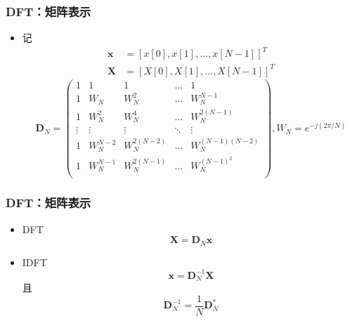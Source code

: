 \documentclass[CJKutf8,dvipsnames,table]{beamer}
\begin{document}
\begin{CJK*}{UTF8}{song}
  \begin{frame}
    \frametitle{DFT：矩阵表示}
    \begin{itemize}
	\item 记
	\begin{align*}
		\mathbf{x} & =[x[0], x[1], \hdots, x[N-1]]^T \\
		\mathbf{X} & =[X[0], X[1], \hdots, X[N-1]]^T
	\end{align*}
	\[
	\mathbf{D}_N=
    \begin{pmatrix}
1      & 1   & 1     & \hdots & 1 \\
1      & W_N & W_N^2 & \hdots & W_N^{N-1} \\
1      & W_N^2 & W_N^4 & \hdots & W_N^{2(N-1)} \\
\vdots & \vdots & \vdots  & \ddots & \vdots \\
1      & W_N^{N-2} & W_N^{2(N-2)} & \hdots & W_N^{(N-1)(N-2)} \\
1      & W_N^{N-1} & W_N^{2(N-1)} & \hdots & W_N^{(N-1)^2} \\

	\end{pmatrix}
	, W_N  = e^{-j(2\pi/N)}
	\]	
	\end{itemize}
  \end{frame} 	
  	
  \begin{frame}
    \frametitle{DFT：矩阵表示}
    \begin{itemize}
	\item DFT
	\[
		\mathbf{X}=\mathbf{D}_N \mathbf{x}
	\]
	\item IDFT
	\[
		\mathbf{x}=\mathbf{D}_N^{-1} \mathbf{X}
	\]
	且
	\[
		\mathbf{D}_N^{-1}=\frac{1}{N}\mathbf{D}_N^{*}
	\]
	\end{itemize}
  \end{frame} 
  	

\end{CJK*}
\end{document}
